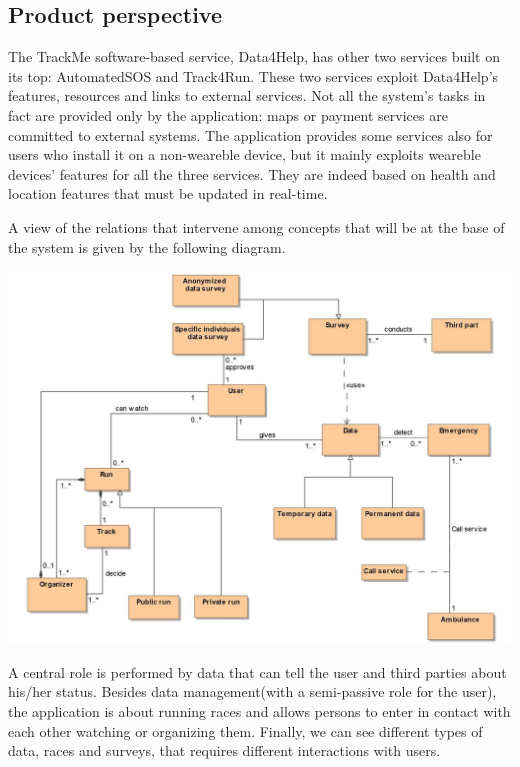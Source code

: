
%

\subsection{Product perspective}
The TrackMe software-based service, Data4Help, has  other two services built on its top: AutomatedSOS and Track4Run. These two services exploit Data4Help's features, resources and links to external services. Not all the system's tasks in fact are provided only by the application: maps or payment services are committed to external systems. The application provides some services also for users who install it on a non-weareble device, but it mainly exploits weareble devices' features for all the three services. They are indeed based on health and location features that must be updated in real-time.\newline

A view of the relations that intervene among concepts that will be at the base of the system is given by the following diagram.\newline

\begin{center}
\includegraphics[scale=1]{sections/diagrams/class_diagram.jpg}
\end{center}

A central role is performed by data that can tell the user and third parties about his/her status. Besides data management(with a semi-passive role for the user), the application is about running races and allows persons to enter in contact with each other watching or organizing them. Finally, we can see different types of data, races and surveys, that requires different interactions with users.\newpage

